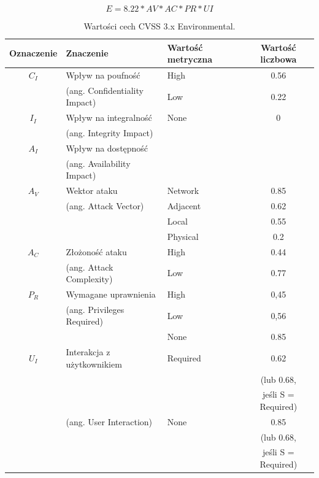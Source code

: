 \begin{equation}
E=8.22 * AV * AC *PR * UI
\end{equation}

\begin{table}[tbh]
\caption{Wartości cech CVSS 3.x Environmental.}
\label{tab:wstep:cvss_3}
\begin{center}
\begin{tabular}{cllc}
\hline \noalign {\smallskip}
\textbf{Oznaczenie} & \textbf{Znaczenie} & \textbf{Wartość metryczna} & \textbf{Wartość liczbowa} \\
\hline \noalign {\smallskip}
$C_I$ & Wpływ na poufność         & High      & 0.56 \\
      & (ang. Confidentiality Impact)  & Low       & 0.22 \\
$I_I$ & Wpływ na integralność     & None      & 0    \\
      & (ang. Integrity Impact)        &           &      \\
$A_I$ & Wpływ na dostępność       &           &      \\
      & (ang. Availability Impact)     &           &      \\
\hline \noalign {\smallskip}
$A_V$ & Wektor ataku              & Network  & 0.85  \\
      & (ang. Attack Vector)           & Adjacent & 0.62  \\
      &                           & Local    & 0.55  \\
      &                           & Physical & 0.2   \\
\hline \noalign {\smallskip}
$A_C$ & Złożoność ataku           & High     & 0.44 \\
      & (ang. Attack Complexity)       & Low	     & 0.77 \\

\hline \noalign {\smallskip}
$P_R$ & Wymagane uprawnienia    &  High & 0,45 \\
      & (ang. Privileges Required)	&  Low	& 0,56 \\
	  &                         &  None	& 0.85 \\

\hline \noalign {\smallskip}
$U_I$ & Interakcja z użytkownikiem & Required & 0.62 \\
      &                            &          & (lub 0.68, \\
      &                            &          & jeśli S = Required) \\
      & (ang. User Interaction)         & None & 0.85 \\
      &                            &      & (lub 0.68, \\
      &                            &      & jeśli S = Required) \\


\end{tabular}
\end{center}
\end{table}
